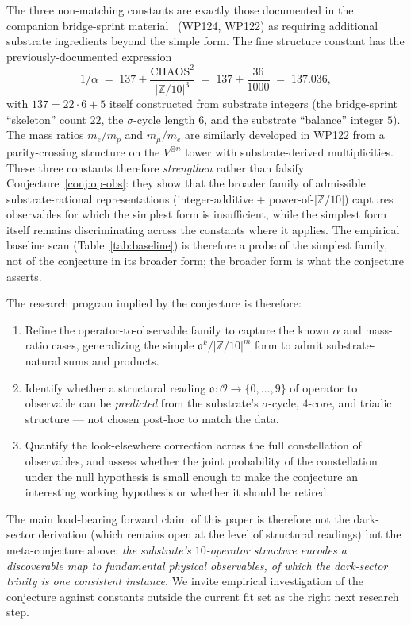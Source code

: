 \documentclass[11pt,reqno]{amsart}
\theoremstyle{plain}
\theoremstyle{definition}
\theoremstyle{remark}
\newcommand{\Z}{\mathbb{Z}}
\begin{document}
The three non-matching constants are exactly those documented in
the companion bridge-sprint
material~\cite{SandersClaudeChat2026BridgeSprint} (WP124, WP122)
as requiring additional substrate ingredients beyond the simple
form. The fine structure constant has the previously-documented
expression
\[
  1/\alpha
  \;=\; 137 + \frac{\mathrm{CHAOS}^{2}}{|\Z/10|^{3}}
  \;=\; 137 + \frac{36}{1000}
  \;=\; 137.036,
\]
with $137 = 22 \cdot 6 + 5$ itself constructed from substrate
integers (the bridge-sprint ``skeleton'' count $22$, the
$\sigma$-cycle length $6$, and the substrate ``balance''
integer $5$). The mass ratios $m_e/m_p$ and $m_\mu/m_e$ are
similarly developed in WP122 from a parity-crossing structure on
the $V^{\otimes n}$ tower with substrate-derived multiplicities.
These three constants therefore \emph{strengthen} rather than
falsify Conjecture~\ref{conj:op-obs}: they show that the broader
family of admissible substrate-rational representations
(integer-additive + power-of-$|\Z/10|$) captures observables for
which the simplest form is insufficient, while the simplest form
itself remains discriminating across the constants where it
applies. The empirical baseline scan
(Table~\ref{tab:baseline}) is therefore a probe of the simplest
family, not of the conjecture in its broader form; the broader
form is what the conjecture asserts.

The research program implied by the conjecture is therefore:
\begin{enumerate}
\item Refine the operator-to-observable family to capture the
known $\alpha$ and mass-ratio cases, generalizing the simple
$\mathfrak{o}^{k}/|\Z/10|^{m}$ form to admit
substrate-natural sums and products.
\item Identify whether a structural reading
$\mathfrak{o}: \mathcal{O} \to \{0, \dots, 9\}$ of operator
to observable can be \emph{predicted} from the substrate's
$\sigma$-cycle, $4$-core, and triadic structure --- not chosen
post-hoc to match the data.
\item Quantify the look-elsewhere correction across the full
constellation of observables, and assess whether the joint
probability of the constellation under the null hypothesis is
small enough to make the conjecture an interesting working
hypothesis or whether it should be retired.
\end{enumerate}

The main load-bearing forward claim of this paper is therefore
not the dark-sector derivation (which remains open at the level
of structural readings) but the meta-conjecture above:
\emph{the substrate's $10$-operator structure encodes a
discoverable map to fundamental physical observables, of which
the dark-sector trinity is one consistent instance.}
We invite empirical investigation of the conjecture against
constants outside the current fit set as the right next research
step.
\end{document}
